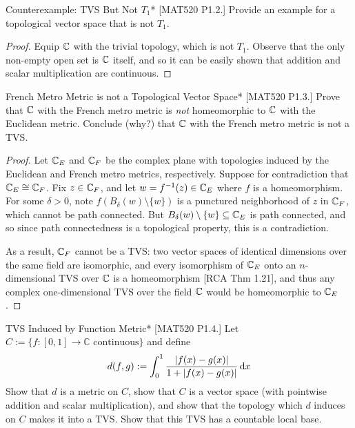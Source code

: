 \begin{problem}{Counterexample: TVS But Not \(T_1\)}*
    [MAT520 P1.2.] Provide an example for a topological vector space that is not \(T_1\). 
\end{problem}

\begin{proof}
    Equip \(\mathbb{C}\) with the trivial topology, which is not \(T_1\). Observe that the only non-empty open set is \(\mathbb{C}\) itself, and so it can be easily shown that addition and scalar multiplication are continuous. 
\end{proof}

\begin{problem}{French Metro Metric is not a Topological Vector Space}*
    [MAT520 P1.3.] Prove that \(\mathbb{C}\) with the French metro metric is \textit{not} homeomorphic to \(\mathbb{C}\) with the Euclidean metric. Conclude (why?) that \(\mathbb{C}\) with the French metro metric is not a TVS. 
\end{problem}

\begin{proof}
    Let \(\mathbb{C}_E\) and \(\mathbb{C}_F\) be the complex plane with topologies induced by the Euclidean and French metro metrics, respectively. Suppose for contradiction that \(\mathbb{C}_E \cong \mathbb{C}_F\). Fix \(z \in \mathbb{C}_F\), and let \(w = f^{-1}(z) \in \mathbb{C}_E\) where \(f\) is a homeomorphism. For some \(\delta > 0\), note \(f(B_\delta(w) \setminus \{w\})\) is a punctured neighborhood of \(z\) in \(\mathbb{C}_F\), which cannot be path connected. But \(B_\delta(w) \setminus \{w\} \subseteq \mathbb{C}_E\) is path connected, and so since path connectedness is a topological property, this is a contradiction. 
    \stdvspace 

    As a result, \(\mathbb{C}_F\) cannot be a TVS: two vector spaces of identical dimensions over the same field are isomorphic, and every isomorphism of \(\mathbb{C}_E\) onto an \(n\)-dimensional TVS over \(\mathbb{C}\) is a homeomorphism [RCA Thm 1.21], and thus any complex one-dimensional TVS over the field \(\mathbb{C}\) would be homeomorphic to \(\mathbb{C}_E\). 
\end{proof}

\begin{problem}{TVS Induced by Function Metric}*
    [MAT520 P1.4.] Let \(C := \{f : [0,1] \to \mathbb{C} \text{ continuous}\} \) and define
    \[
        d(f,g) := \int_{0}^{1} \frac{|f(x)-g(x)|}{1 + |f(x)-g(x)|}\, \mathrm{d}x
    \]
    Show that \(d\) is a metric on \(C\), show that \(C\) is a vector space (with pointwise addition and scalar multiplication), and show that the topology which \(d\) induces on \(C\) makes it into a TVS. Show that this TVS has a countable local base.
\end{problem}

